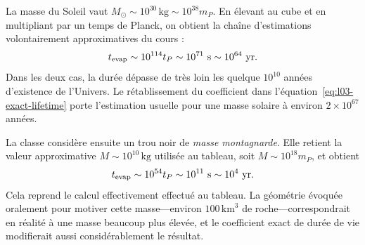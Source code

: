 La masse du Soleil vaut \(M_\odot\sim10^{30}\,\mathrm{kg}\sim10^{38}m_P\). En élevant au cube et en multipliant par un temps de Planck, on obtient la chaîne d’estimations volontairement approximatives du cours :
\begin{equation}
t_{\mathrm{evap}}\sim10^{114}t_P
\sim10^{71}\ {\rm s}
\sim10^{64}\ {\rm yr}.
\end{equation}
Dans les deux cas, la durée dépasse de très loin les quelque \(10^{10}\) années d’existence de l’Univers. Le rétablissement du coefficient dans l’équation~\eqref{eq:l03-exact-lifetime} porte l’estimation usuelle pour une masse solaire à environ \(2\times10^{67}\) années.

La classe considère ensuite un trou noir de \emph{masse montagnarde}. Elle retient la valeur approximative \(M\sim10^{10}\,\mathrm{kg}\) utilisée au tableau, soit \(M\sim10^{18}m_P\), et obtient
\begin{equation}
t_{\mathrm{evap}}\sim10^{54}t_P
\sim10^{11}\ {\rm s}
\sim10^4\ {\rm yr}.
\end{equation}
Cela reprend le calcul effectivement effectué au tableau. La géométrie évoquée oralement pour motiver cette masse---environ \(100\,\mathrm{km}^3\) de roche---correspondrait en réalité à une masse beaucoup plus élevée, et le coefficient exact de durée de vie modifierait aussi considérablement le résultat.

\begin{classroomqa}
\end{classroomqa}

